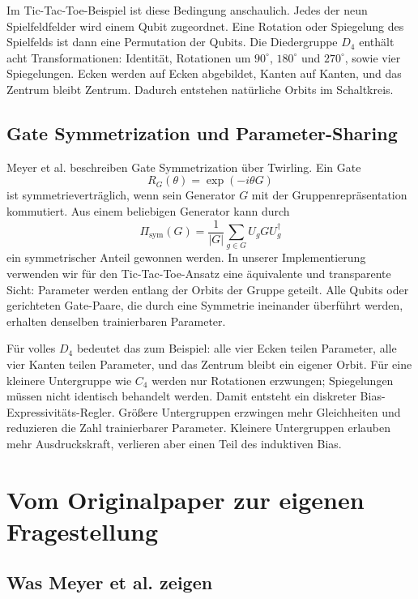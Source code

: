 Im Tic-Tac-Toe-Beispiel ist diese Bedingung anschaulich. Jedes der neun Spielfeldfelder wird einem Qubit zugeordnet. Eine Rotation oder Spiegelung des Spielfelds ist dann eine Permutation der Qubits. Die Diedergruppe $D_4$ enthält acht Transformationen: Identität, Rotationen um $90^\circ$, $180^\circ$ und $270^\circ$, sowie vier Spiegelungen. Ecken werden auf Ecken abgebildet, Kanten auf Kanten, und das Zentrum bleibt Zentrum. Dadurch entstehen natürliche Orbits im Schaltkreis.

\subsection{Gate Symmetrization und Parameter-Sharing}\label{subsec:sharing}

Meyer et al. beschreiben Gate Symmetrization über Twirling. Ein Gate
\begin{equation}
R_G(\theta)=\exp(-i\theta G)
\end{equation}
ist symmetrieverträglich, wenn sein Generator $G$ mit der Gruppenrepräsentation kommutiert. Aus einem beliebigen Generator kann durch
\begin{equation}
\Pi_{\mathrm{sym}}(G)
=\frac{1}{|G|}\sum_{g\in G}U_g G U_g^\dagger
\label{eq:twirling}
\end{equation}
ein symmetrischer Anteil gewonnen werden. In unserer Implementierung verwenden wir für den Tic-Tac-Toe-Ansatz eine äquivalente und transparente Sicht: Parameter werden entlang der Orbits der Gruppe geteilt. Alle Qubits oder gerichteten Gate-Paare, die durch eine Symmetrie ineinander überführt werden, erhalten denselben trainierbaren Parameter.

Für volles $D_4$ bedeutet das zum Beispiel: alle vier Ecken teilen Parameter, alle vier Kanten teilen Parameter, und das Zentrum bleibt ein eigener Orbit. Für eine kleinere Untergruppe wie $C_4$ werden nur Rotationen erzwungen; Spiegelungen müssen nicht identisch behandelt werden. Damit entsteht ein diskreter Bias-Expressivitäts-Regler. Größere Untergruppen erzwingen mehr Gleichheiten und reduzieren die Zahl trainierbarer Parameter. Kleinere Untergruppen erlauben mehr Ausdruckskraft, verlieren aber einen Teil des induktiven Bias.

\section{Vom Originalpaper zur eigenen Fragestellung}\label{sec:fragestellung}

\subsection{Was Meyer et al. zeigen}\label{subsec:meyer}

